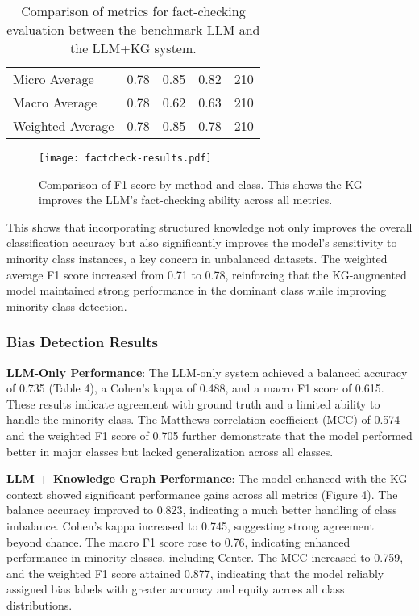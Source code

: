 \documentclass{scrartcl}
\begin{document}
\begin{table}[H]
\begin{center}
\begin{tabular}{lcccc}
Micro Average    & 0.78                          & 0.85                       & 0.82                         & 210                         \\
Macro Average    & 0.78                          & 0.62                       & 0.63                         & 210                         \\
Weighted Average & 0.78                          & 0.85                       & 0.78                         & 210                         \\ \hline
\end{tabular}
\caption{Comparison of metrics for fact-checking evaluation between the benchmark LLM and the LLM+KG system.}
\label{tab:my_table}
\end{center}
\end{table}

\begin{figure}[H]
\begin{center}
\texttt{[image: factcheck-results.pdf]}
\end{center}
\caption{Comparison of F1 score by method and class. This shows the KG improves the LLM's fact-checking ability across all metrics.}
\label{fig:factcheck-results}
\end{figure}
This shows that incorporating structured knowledge not only improves the overall classification accuracy but also significantly improves the model’s sensitivity to minority class instances, a key concern in unbalanced datasets. The weighted average F1 score increased from 0.71 to 0.78, reinforcing that the KG-augmented model maintained strong performance in the dominant class while improving minority class detection.


\subsubsection{Bias Detection Results}
\textbf{LLM-Only Performance}: The LLM-only system achieved a balanced accuracy of 0.735 (Table 4), a Cohen’s kappa of 0.488, and a macro F1 score of 0.615. These results indicate agreement with ground truth and a limited ability to handle the minority class. The Matthews correlation coefficient (MCC) of 0.574 and the weighted F1 score of 0.705 further demonstrate that the model performed better in major classes but lacked generalization across all classes.
 
\textbf{LLM + Knowledge Graph Performance}: The model enhanced with the KG context showed significant performance gains across all metrics (Figure 4). The balance accuracy improved to 0.823, indicating a much better handling of class imbalance. Cohen’s kappa increased to 0.745, suggesting strong agreement beyond chance. The macro F1 score rose to 0.76, indicating enhanced performance in minority classes, including Center. The MCC increased to 0.759, and the weighted F1 score attained 0.877, indicating that the model reliably assigned bias labels with greater accuracy and equity across all class distributions. 
\end{document}
